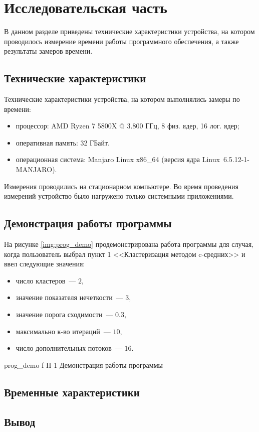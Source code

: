 \chapter{Исследовательская часть}

В данном разделе приведены технические характеристики устройства, на котором проводилось измерение времени работы программного обеспечения, а также результаты замеров времени.

\section{Технические характеристики}

Технические характеристики устройства, на котором выполнялись замеры по времени:

\begin{itemize}
	\item процессор: AMD Ryzen 7 5800X @ 3.800 ГГц, 8 физ. ядер, 16 лог. ядер;
	\item оперативная память: 32 ГБайт.
	\item операционная система: Manjaro Linux x86\_64 (версия ядра Linux~6.5.12-1-MANJARO).
\end{itemize}

Измерения проводились на стационарном компьютере.
Во время проведения измерений устройство было нагружено только системными приложениями.


\section{Демонстрация работы программы}

На рисунке \ref{img:prog_demo} продемонстрирована работа программы для случая, когда пользователь выбрал пункт 1 <<Кластеризация методом c-средних>> и ввел следующие значения:
\begin{itemize}
	\item число кластеров~--- $2$,
	\item значение показателя нечеткости~--- $3$,
	\item значение порога сходимости~--- $0.3$,
	\item максимально к-во итераций~--- $10$,
	\item число дополнительных потоков~--- $16$.
\end{itemize}

	{prog_demo}
	{f}
	{H}
	{1\textwidth}
	{Демонстрация работы программы}

\section{Временные характеристики}

\section*{Вывод}
